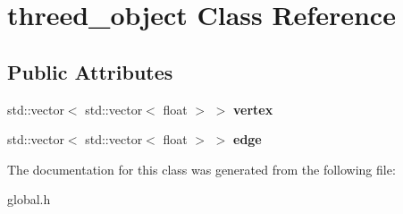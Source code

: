 \hypertarget{classthreed__object}{}\section{threed\+\_\+object Class Reference}
\label{classthreed__object}
\subsection*{Public Attributes}
\begin{DoxyCompactItemize}
\item 
\mbox{\label{classthreed__object_ae751ea4016da579a541b91111d2bedbd}} 
std\+::vector$<$ std\+::vector$<$ float $>$ $>$ {\bfseries vertex}
\item 
\mbox{\label{classthreed__object_a1503471aa6ac00fd2c093abe91644f3a}} 
std\+::vector$<$ std\+::vector$<$ float $>$ $>$ {\bfseries edge}
\end{DoxyCompactItemize}


The documentation for this class was generated from the following file\+:\begin{DoxyCompactItemize}
\item 
global.\+h\end{DoxyCompactItemize}
